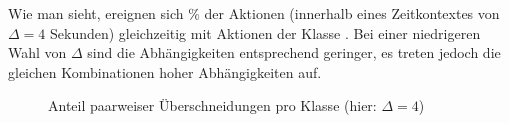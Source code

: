Wie man sieht, ereignen sich  \% der Aktionen  (innerhalb eines Zeitkontextes von $\Delta=4$ Sekunden) gleichzeitig mit Aktionen der Klasse .
Bei einer niedrigeren Wahl von $\Delta$ sind die Abhängigkeiten entsprechend geringer, es treten jedoch die gleichen Kombinationen hoher Abhängigkeiten auf.

\begin{figure}
    \centering
    \caption{Anteil paarweiser Überschneidungen pro Klasse (hier: $\Delta = 4$)}
    \label{fig:overlaps}
\end{figure}
